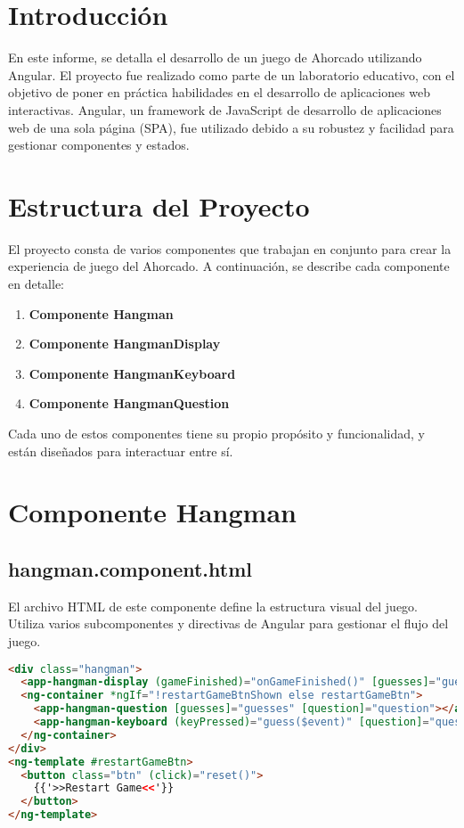\section{Introducción}

En este informe, se detalla el desarrollo de un juego de Ahorcado utilizando Angular. El proyecto fue realizado como parte de un laboratorio educativo, con el objetivo de poner en práctica habilidades en el desarrollo de aplicaciones web interactivas. Angular, un framework de JavaScript de desarrollo de aplicaciones web de una sola página (SPA), fue utilizado debido a su robustez y facilidad para gestionar componentes y estados.

\section{Estructura del Proyecto}

El proyecto consta de varios componentes que trabajan en conjunto para crear la experiencia de juego del Ahorcado. A continuación, se describe cada componente en detalle:

\begin{enumerate}
  \item \textbf{Componente Hangman}
  \item \textbf{Componente HangmanDisplay}
  \item \textbf{Componente HangmanKeyboard}
  \item \textbf{Componente HangmanQuestion}
\end{enumerate}

Cada uno de estos componentes tiene su propio propósito y funcionalidad, y están diseñados para interactuar entre sí.

\section{Componente Hangman}

\subsection{hangman.component.html}

El archivo HTML de este componente define la estructura visual del juego. Utiliza varios subcomponentes y directivas de Angular para gestionar el flujo del juego.

\begin{lstlisting}[language=HTML]
<div class="hangman">
  <app-hangman-display (gameFinished)="onGameFinished()" [guesses]="guesses" [question]="question"></app-hangman-display>
  <ng-container *ngIf="!restartGameBtnShown else restartGameBtn">
    <app-hangman-question [guesses]="guesses" [question]="question"></app-hangman-question>
    <app-hangman-keyboard (keyPressed)="guess($event)" [question]="question"></app-hangman-keyboard>
  </ng-container>
</div>
<ng-template #restartGameBtn>
  <button class="btn" (click)="reset()">
    {{'>>Restart Game<<'}}
  </button>
</ng-template>
\end{lstlisting}

